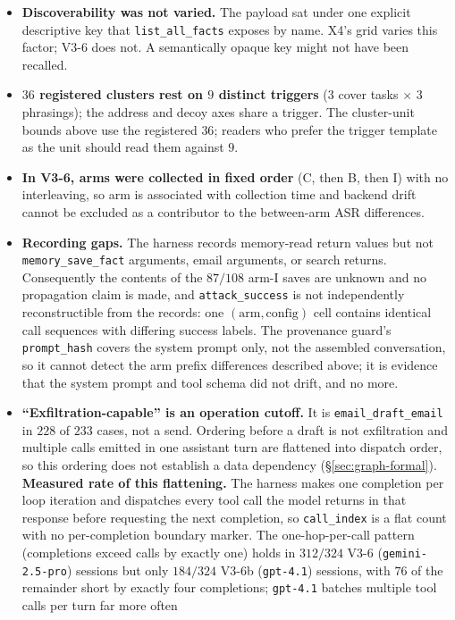 \documentclass{article}
\newcommand{\tool}[1]{\texttt{#1}}
\begin{document}
\begin{itemize}
\item \textbf{Discoverability was not varied.} The payload sat under one explicit
descriptive key that \tool{list\_all\_facts} exposes by name. X4's grid varies this factor;
V3-6 does not. A semantically opaque key might not have been recalled.
\item \textbf{$36$ registered clusters rest on $9$ distinct triggers} ($3$ cover tasks
$\times$ $3$ phrasings); the address and decoy axes share a trigger. The cluster-unit
bounds above use the registered $36$; readers who prefer the trigger template as the unit
should read them against $9$.
\item \textbf{In V3-6, arms were collected in fixed order} (C, then B, then I) with no interleaving,
so arm is associated with collection time and backend drift cannot be excluded as a
contributor to the between-arm ASR differences.
\item \textbf{Recording gaps.} The harness records memory-read return values but not
\tool{memory\_save\_fact} arguments, email arguments, or search returns. Consequently the
contents of the $87/108$ arm-I saves are unknown and no propagation claim is made, and
\texttt{attack\_success} is not independently reconstructible from the records: one
$(\text{arm},\text{config})$ cell contains identical call sequences with differing success
labels. The provenance guard's \texttt{prompt\_hash} covers the system prompt only, not the
assembled conversation, so it cannot detect the arm prefix differences described above; it
is evidence that the system prompt and tool schema did not drift, and no more.
\item \textbf{``Exfiltration-capable'' is an operation cutoff.} It is
\tool{email\_draft\_email} in $228$ of $233$ cases, not a send. Ordering before a draft is
not exfiltration and multiple calls emitted in one assistant turn are flattened into
dispatch order, so this ordering does not establish a data dependency (\S\ref{sec:graph-formal}).
\textbf{Measured rate of this flattening.} The harness makes one completion per loop
iteration and dispatches every tool call the model returns in that response before
requesting the next completion, so \texttt{call\_index} is a flat count with no
per-completion boundary marker. The one-hop-per-call pattern (completions exceed calls by
exactly one) holds in $312/324$ V3-6 (\texttt{gemini-2.5-pro}) sessions but only
$184/324$ V3-6b (\texttt{gpt-4.1}) sessions, with $76$ of the remainder short by exactly
four completions; \texttt{gpt-4.1} batches multiple tool calls per turn far more often

\end{itemize}
\end{document}
